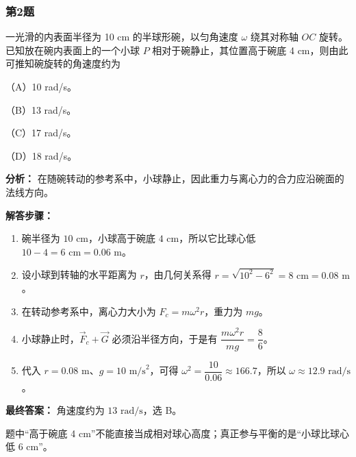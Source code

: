 \documentclass[12pt,a4paper]{ctexart}
\begin{document}
\subsubsection*{第2题}
\begin{tcolorbox}[colback=gray!2!white,colframe=black!60,title={题目}]
一光滑的内表面半径为 10 cm 的半球形碗，以匀角速度 \(\omega\) 绕其对称轴 \(OC\) 旋转。已知放在碗内表面上的一个小球 \(P\) 相对于碗静止，其位置高于碗底 4 cm，则由此可推知碗旋转的角速度约为\par
（A）10 rad/s。\par
（B）13 rad/s。\par
（C）17 rad/s。\par
（D）18 rad/s。\par
\end{tcolorbox}
\begin{tcolorbox}[colback=blue!2!white,colframe=blue!55!black,title={完整答案}]
\textbf{分析：}
在随碗转动的参考系中，小球静止，因此重力与离心力的合力应沿碗面的法线方向。\par
\textbf{解答步骤：}
\begin{enumerate}
\item 碗半径为 \(10\text{ cm}\)，小球高于碗底 \(4\text{ cm}\)，所以它比球心低 \(10-4=6\text{ cm}=0.06\text{ m}\)。
\item 设小球到转轴的水平距离为 \(r\)，由几何关系得 \(r=\sqrt{10^2-6^2}=8\text{ cm}=0.08\text{ m}\)。
\item 在转动参考系中，离心力大小为 \(F_c=m\omega^2 r\)，重力为 \(mg\)。
\item 小球静止时，\(\vec F_c+\vec G\) 必须沿半径方向，于是有 \(\dfrac{m\omega^2 r}{mg}=\dfrac{8}{6}\)。
\item 代入 \(r=0.08\text{ m}\)、\(g=10\text{ m/s}^2\)，可得 \(\omega^2=\dfrac{10}{0.06}\approx 166.7\)，所以 \(\omega\approx 12.9\text{ rad/s}\)。
\end{enumerate}
\textbf{最终答案：}
角速度约为 \(13\text{ rad/s}\)，选 B。\par
\end{tcolorbox}
\begin{tcolorbox}[colback=red!2!white,colframe=red!55!black,title={易错点}]
题中“高于碗底 4 cm”不能直接当成相对球心高度；真正参与平衡的是“小球比球心低 6 cm”。\par
\end{tcolorbox}
\end{document}
